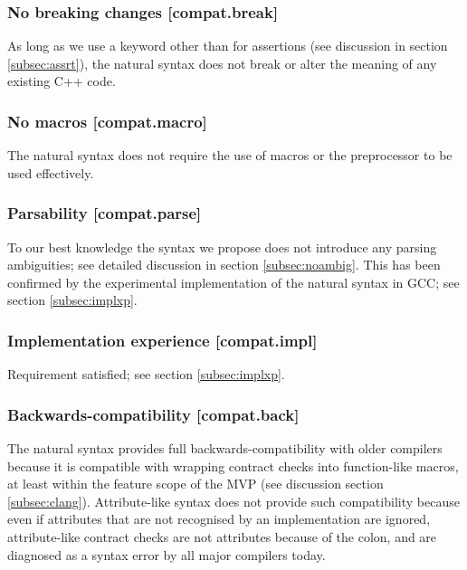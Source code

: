 \subsubsection{No breaking changes  [compat.break]}

As long as we use a keyword other than  for assertions (see discussion in section \ref{subsec:assrt}), the natural syntax does not break or alter the meaning of any existing C++ code.

\subsubsection{No macros  [compat.macro]}

The natural syntax does not require the use of macros or the preprocessor to be used effectively.

\subsubsection{Parsability  [compat.parse]}

To our best knowledge the syntax we propose does not introduce any parsing ambiguities; see detailed discussion in section \ref{subsec:noambig}. This has been confirmed by the experimental implementation of the natural syntax in GCC; see section \ref{subsec:implxp}.

\subsubsection{Implementation experience  [compat.impl]}

Requirement satisfied; see section \ref{subsec:implxp}.

\subsubsection{Backwards-compatibility  [compat.back]}

The natural syntax provides full backwards-compatibility with older compilers because it is compatible with wrapping contract checks into function-like macros, at least within the feature scope of the MVP (see discussion section \ref{subsec:clang}). Attribute-like syntax does not provide such compatibility because even if attributes that are not recognised by an implementation are ignored, attribute-like contract checks are not attributes because of the colon, and are diagnosed as a syntax error by all major compilers today.

